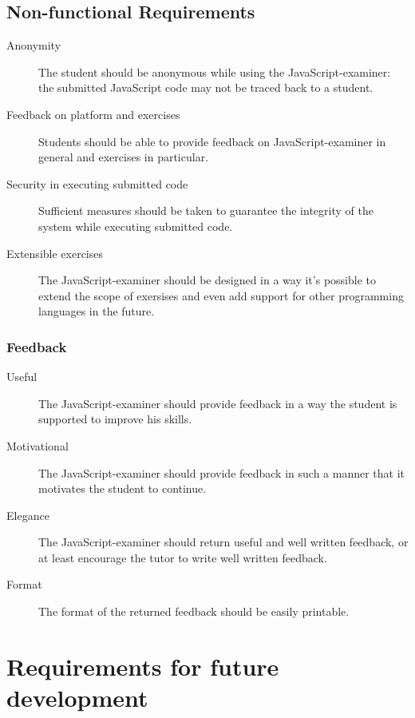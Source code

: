 \documentclass{article}
\begin{document}
\subsection{Non-functional Requirements}
\begin{description}
  \item[Anonymity] The student should be anonymous while using the
    JavaScript-examiner: the submitted JavaScript code may not be traced back
    to a student.
  \item[Feedback on platform and exercises] Students should be able to provide
    feedback on JavaScript-examiner in general and exercises in particular.
  \item[Security in executing submitted code] Sufficient measures should be
    taken to guarantee the integrity of the system while executing submitted
    code.
  \item[Extensible exercises] The JavaScript-examiner should be designed in a
    way it's possible to extend the scope of exersises and even add support for
    other programming languages in the future. 
\end{description}

\subsubsection{Feedback}
\begin{description}
  \item[Useful] The JavaScript-examiner should provide feedback in a way
    the student is supported to improve his skills.
  \item[Motivational] The JavaScript-examiner should provide feedback in such a
    manner that it motivates the student to continue.
  \item[Elegance] The JavaScript-examiner should return useful and well written 
    feedback, or at least encourage the tutor to write well written feedback.
  \item[Format] The format of the returned feedback should be easily printable.
\end{description}

\section{Requirements for future development}
\end{document}
